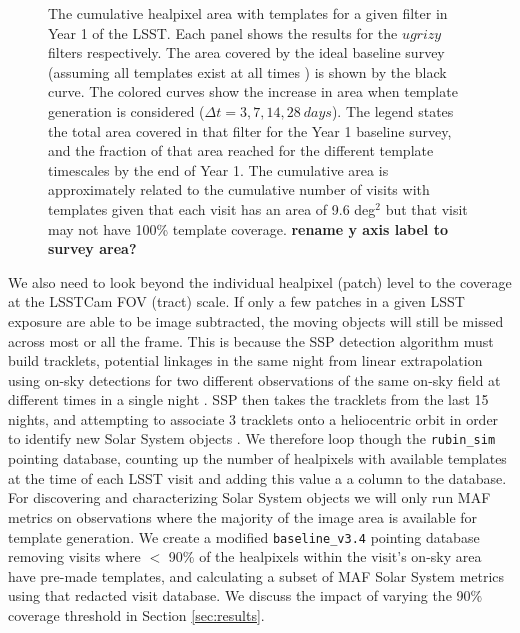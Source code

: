 \documentclass[preprint,linenumbers]{aastex631}
\newcommand{\baseline}{\texttt{baseline\_v3.4}\xspace}
\begin{document}
{\begin{figure}
			\caption{The cumulative healpixel area with templates for a given filter in Year 1 of the LSST.
				Each panel shows the results for the $ugrizy$ filters respectively.
				The area covered by the ideal baseline survey (assuming all templates exist at all times ) is shown by the black curve.
				The colored curves show the increase in area when template generation is considered ($\Delta t = 3, 7, 14, 28\ \si{days}$).
				The legend states the total area covered in that filter for the Year 1 baseline survey, and the fraction of that area reached for the different template timescales by the end of Year 1.
				The cumulative area is approximately related to the cumulative number of visits with templates given that each visit has an area of 9.6 deg$^2$ but that visit may not have 100\% template coverage.
				\textbf{rename y axis label to survey area?}
			}
			\label{fig:cum_baseline_filter}
			
		\end{figure}
		
		We also need to look beyond the individual healpixel (patch) level to the coverage at the LSSTCam FOV (tract) scale. If only a few patches in a given LSST exposure are able to be image subtracted, the moving objects will still be missed across most or all the frame. This is because the SSP detection algorithm must build tracklets, potential linkages in the same night from linear extrapolation using on-sky detections for two different observations of the same on-sky field at different times in a single night \citep{lsstMOPS,lsstSSP}.  SSP then takes the tracklets from the last 15 nights, and attempting to associate 3 tracklets onto a heliocentric orbit in order to identify new Solar System objects \citep{lsstMOPS,lsstSSP}. We therefore loop though the \texttt{rubin\_sim} pointing database, counting up the number of healpixels with available templates at the time of each LSST visit and adding this value a a column to the database. For discovering and characterizing Solar System objects we will only run MAF metrics on observations where the majority of the image area is available for template generation. We create a modified  \baseline pointing database removing visits where $<$ 90$\%$ of the healpixels within the visit's on-sky area have pre-made templates, and calculating a subset of MAF Solar System metrics using that redacted visit database.  We discuss the impact of varying the 90$\%$  coverage threshold in Section \ref{sec:results}.  
		
		
		
}
\end{document}

